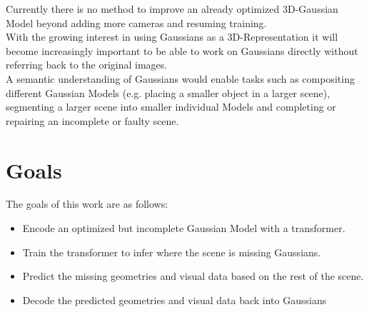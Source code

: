 Currently there is no method to improve an already optimized 3D-Gaussian Model beyond adding more cameras and resuming training.\\
With the growing interest in using Gaussians as a 3D-Representation \cite{chen2024survey} it will become increasingly important to be able to work on Gaussians directly without referring back to the original images.\\
A semantic understanding of Gaussians would enable tasks such as compositing different Gaussian Models (e.g. placing a smaller object in a larger scene), segmenting a larger scene into smaller individual Models and completing or repairing an incomplete or faulty scene.
\section{Goals}
The goals of this work are as follows:\\
\begin{itemize}
    \item Encode an optimized but incomplete Gaussian Model with a transformer.
    \item Train the transformer to infer where the scene is missing Gaussians.
    \item Predict the missing geometries and visual data based on the rest of the scene.
    \item Decode the predicted geometries and visual data back into Gaussians
\end{itemize}

